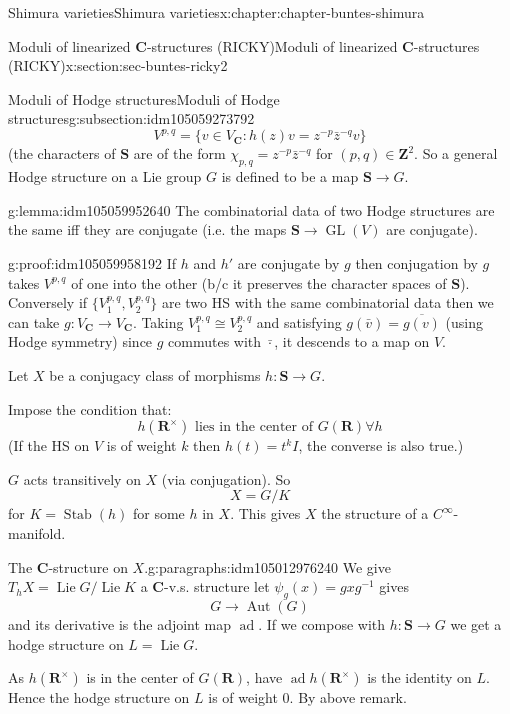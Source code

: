 \documentclass[oneside,10pt,]{book}
\numberwithin{equation}{section}
\DeclareMathOperator{\Lie}{Lie}
\newcommand{\inv}{^{-1}}
\newcommand{\ZZ}{\mathbf{Z}}
\newcommand{\RR}{\mathbf{R}}
\newcommand{\CC}{\mathbf{C}}
\DeclareMathOperator{\Stab}{Stab}
\DeclareMathOperator{\ad}{ad}
\DeclareMathOperator{\Aut}{Aut}
\DeclareMathOperator{\GL}{GL}
\begin{document}
\begin{chapterptx}{Shimura varieties}{}{Shimura varieties}{}{}{x:chapter:chapter-buntes-shimura}
\begin{sectionptx}{Moduli of linearized \(\CC\)-structures (RICKY)}{}{Moduli of linearized \(\CC\)-structures (RICKY)}{}{}{x:section:sec-buntes-ricky2}
\begin{subsectionptx}{Moduli of Hodge structures}{}{Moduli of Hodge structures}{}{}{g:subsection:idm105059273792}
\begin{equation*}
V^{p,q} = \{ v \in V_\CC : h(z) v= z^{-p} \bar z ^{-q} v\}
\end{equation*}
(the characters of \(\mathbf S\) are of the form \(\chi_{p,q} = z^{-p} \bar z ^{-q}\) for \((p,q)\in \ZZ^2\). So a general Hodge structure on a Lie group  \(G\) is defined to be a map \(\mathbf S \to G\).%
\begin{lemma}{}{}{g:lemma:idm105059952640}%
The combinatorial data of two Hodge structures are the same iff they are conjugate (i.e. the maps \(\mathbf S \to \GL(V)\) are conjugate).%
\end{lemma}
\begin{proofptx}{}{g:proof:idm105059958192}
If \(h\) and \(h'\) are conjugate by \(g\) then conjugation by \(g\) takes \(V^{p,q}\) of one into the other (b\slash{}c it preserves the character spaces of \(\mathbf S\)). Conversely if \(\{V_1^{p,q}, V_2^{p,q}\}\) are two HS with the same combinatorial data then we can take \(g \colon V_{\CC} \to V_{\CC}\). Taking \(V_1^{p,q} \cong V_2^{p,q}\) and satisfying \(g(\bar v) = \overline{g(v)}\) (using Hodge symmetry) since \(g\) commutes with \(\bar \cdot\), it descends to a  map on \(V\).%
\end{proofptx}
Let  \(X\) be a conjugacy class of morphisms \(h\colon \mathbf S \to G\).%
\par
Impose the condition that:%
\begin{equation}
h(\RR^\times) \text{ lies in the center of }G(\RR) \forall h\label{g:men:idm105060002096}
\end{equation}
(If the HS on \(V\) is of weight \(k\) then \(h(t) = t^k I\), the converse is also true.)%
\par
\(G\) acts transitively on \(X\) (via conjugation). So%
\begin{equation*}
X=  G/K
\end{equation*}
for \(K = \Stab(h) \) for some \(h\) in \(X\). This gives \(X\) the structure of a \(C^\infty\)-manifold.%
\begin{paragraphs}{The \(\CC\)-structure on \(X\).}{g:paragraphs:idm105012976240}%
We give \(T_hX = \Lie G / \Lie K\) a \(\CC\)-v.s. structure let \(\psi_g (x)  = g x g \inv\) gives%
\begin{equation*}
G\to \Aut(G)
\end{equation*}
and its derivative is the adjoint map \(\ad\). If we compose with \(h \colon \mathbf S\to G\) we get a hodge structure on \(L=  \Lie G\).%
\par
As \(h(\RR^\times)\) is in the center of \(G(\RR)\), have \(\ad h(\RR^\times)\) is the identity on \(L\). Hence the hodge structure on \(L\) is of weight 0. By above remark.%

\end{paragraphs}
\end{subsectionptx}
\end{sectionptx}
\end{chapterptx}
\end{document}

